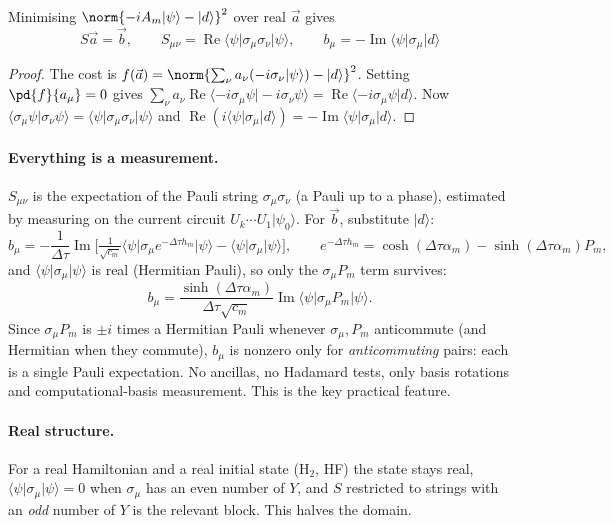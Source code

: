 \documentclass[11pt,a4paper]{article}
\newcommand{\ket}[1]{\lvert #1\rangle}
\newcommand{\bra}[1]{\langle #1\rvert}
\begin{document}
\begin{proposition}\label{prop:linsys}
Minimising $\norm{-iA_m\ket\psi-\ket d}^2$ over real $\vec a$ gives
\begin{equation}\label{eq:linsys}
  \boxed{\;S\vec a=\vec b,\qquad
  S_{\mu\nu}=\operatorname{Re}\bra\psi\sigma_\mu\sigma_\nu\ket\psi,\qquad
  b_\mu=-\operatorname{Im}\bra\psi\sigma_\mu\ket{d}\;}
\end{equation}
\end{proposition}
\begin{proof}
The cost is $f(\vec a)=\norm{\sum_\nu a_\nu(-i\sigma_\nu\ket\psi)-\ket d}^2$. Setting
$\pd{f}{a_\mu}=0$ gives $\sum_\nu a_\nu\operatorname{Re}\langle -i\sigma_\mu\psi\vert -i\sigma_\nu\psi\rangle
=\operatorname{Re}\langle -i\sigma_\mu\psi\vert d\rangle$. Now
$\langle\sigma_\mu\psi\vert\sigma_\nu\psi\rangle=\bra\psi\sigma_\mu\sigma_\nu\ket\psi$
and $\operatorname{Re}(i\bra\psi\sigma_\mu\ket d)=-\operatorname{Im}\bra\psi\sigma_\mu\ket d$.
\end{proof}

\paragraph{Everything is a measurement.}
$S_{\mu\nu}$ is the expectation of the Pauli string $\sigma_\mu\sigma_\nu$ (a Pauli up to a phase),
estimated by measuring on the current circuit $U_{k}\cdots U_1\ket{\psi_0}$. For $\vec b$,
substitute $\ket d$:
\begin{equation}
  b_\mu=-\frac{1}{\Delta\tau}\operatorname{Im}\Big[\tfrac{1}{\sqrt{c_m}}\bra\psi\sigma_\mu e^{-\Delta\tau h_m}\ket\psi-\bra\psi\sigma_\mu\ket\psi\Big],
  \qquad e^{-\Delta\tau h_m}=\cosh(\Delta\tau\alpha_m)-\sinh(\Delta\tau\alpha_m)P_m,
\end{equation}
and $\bra\psi\sigma_\mu\ket\psi$ is real (Hermitian Pauli), so only the $\sigma_\mu P_m$ term survives:
\begin{equation}
  b_\mu=\frac{\sinh(\Delta\tau\alpha_m)}{\Delta\tau\sqrt{c_m}}\operatorname{Im}\bra\psi\sigma_\mu P_m\ket\psi .
\end{equation}
Since $\sigma_\mu P_m$ is $\pm i$ times a Hermitian Pauli whenever $\sigma_\mu,P_m$ anticommute
(and Hermitian when they commute), $b_\mu$ is nonzero only for \emph{anticommuting} pairs:
each is a single Pauli expectation. No ancillas, no Hadamard tests, only basis rotations and
computational-basis measurement. This is the key practical feature.

\paragraph{Real structure.}
For a real Hamiltonian and a real initial state ($\mathrm{H}_2$, HF) the state stays real,
$\bra\psi\sigma_\mu\ket\psi=0$ when $\sigma_\mu$ has an even number of $Y$, and $S$ restricted to
strings with an \emph{odd} number of $Y$ is the relevant block. This halves the domain.
\end{document}
